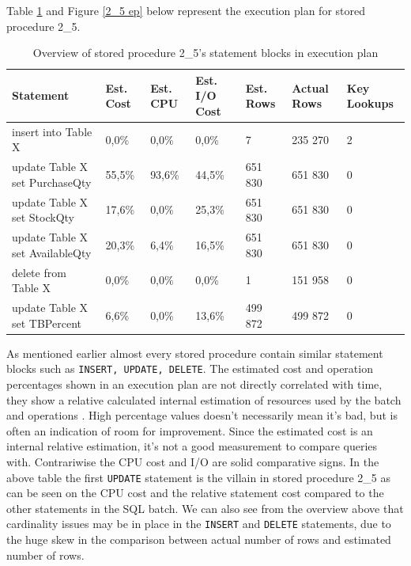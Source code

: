 \documentclass{cslthse-msc}
\begin{document}
Table \ref{2_5 overview} and Figure \ref{2_5 ep} below represent the execution plan for stored procedure 2\_5.
\begin{table}[H]
\begin{center}
\hspace*{-2cm}
\begin{tabular}{|l|l|l|l|l|l|l|}
\hline
Statement & Est. Cost & Est. CPU & Est. I/O Cost & Est. Rows & Actual Rows & Key Lookups\\\hline
insert into  Table X &	0,0\% & 0,0\% & 0,0\% & \cellcolor{red} 7 & \cellcolor{red} 235 270 & 2\\\hline 
update  Table X set PurchaseQty & 55,5\% & 93,6\% & 44,5\% & 651 830 & 651 830 & 0 \\\hline 
update  Table X set StockQty & 17,6\% & 0,0\% & 25,3\% & 651 830 & 651 830 & 0 \\\hline 
update  Table X set AvailableQty & 20,3\% & 6,4\% & 16,5\% & 651 830 & 651 830 & 0 \\\hline 
delete from  Table X & 0,0\% & 0,0\% & 0,0\% &\cellcolor{red} 1 & \cellcolor{red} 151 958& 0 \\\hline 
update  Table X set TBPercent & 6,6\% & 0,0\% & 13,6\% & 499 872 &  499 872 & 0 \\\hline 
\end{tabular}
\caption{Overview of stored procedure 2\_5's statement blocks in execution plan}
\label{2_5 overview}
\end{center}
\end{table}
\noindent As mentioned earlier almost every stored procedure contain similar statement blocks such as \texttt{INSERT, UPDATE, DELETE}. The estimated cost and operation percentages shown in an execution plan are not directly correlated with time, they show a relative calculated internal estimation of resources used by the batch and operations \cite{cost}. High percentage values doesn't necessarily mean it's bad, but is often an indication of room for improvement. Since the estimated cost is an internal relative estimation, it's not a good measurement to compare queries with. Contrariwise the CPU cost and I/O are solid comparative signs. In the above table the first \texttt{UPDATE} statement is the villain in stored procedure 2\_5 as can be seen on the CPU cost and the relative statement cost compared to the other statements in the SQL batch. We can also see from the overview above that cardinality issues may be in place in the \texttt{INSERT} and \texttt{DELETE} statements, due to the huge skew in the comparison between actual number of rows and estimated number of rows.    
\end{document}
